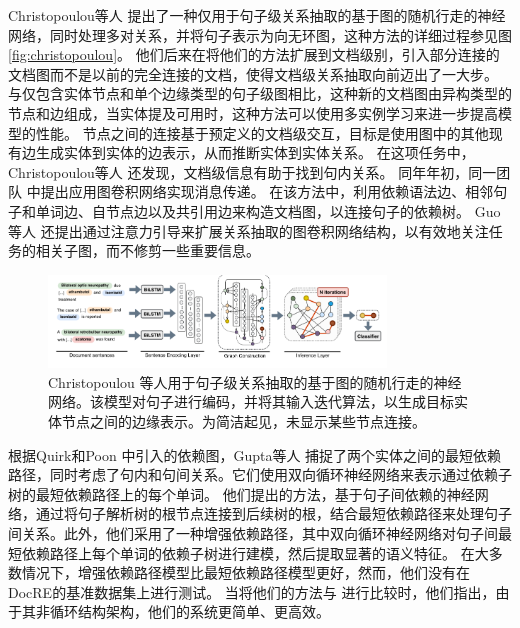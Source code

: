 \documentclass[bachelor]{thesis-uestc}
\begin{document}
Christopoulou等人 \cite{christopoulou-etal-2018-walk} 提出了一种仅用于句子级关系抽取的基于图的随机行走的神经网络，同时处理多对关系，并将句子表示为向无环图，这种方法的详细过程参见图\ref{fig:christopoulou}。
他们后来在将他们的方法扩展到文档级别，引入部分连接的文档图而不是以前的完全连接的文档，使得文档级关系抽取向前迈出了一大步。
与仅包含实体节点和单个边缘类型的句子级图相比，这种新的文档图由异构类型的节点和边组成，当实体提及可用时，这种方法可以使用多实例学习来进一步提高模型的性能。
节点之间的连接基于预定义的文档级交互，目标是使用图中的其他现有边生成实体到实体的边表示，从而推断实体到实体关系。
在这项任务中，Christopoulou等人 \cite{christopoulou-etal-2019-connecting}还发现，文档级信息有助于找到句内关系。
同年年初，同一团队 \cite{sahu-etal-2019-inter}中提出应用图卷积网络实现消息传递。
在该方法中，利用依赖语法边、相邻句子和单词边、自节点边以及共引用边来构造文档图，以连接句子的依赖树。
Guo等人 \cite{guo-etal-2019-attention}还提出通过注意力引导来扩展关系抽取的图卷积网络结构，以有效地关注任务的相关子图，而不修剪一些重要信息。\par
\begin{figure}
    \centering
    \includegraphics[width=0.8\textwidth]{misc/DAG2018.png}
    \caption{Christopoulou \cite{christopoulou-etal-2018-walk} 等人用于句子级关系抽取的基于图的随机行走的神经网络。该模型对句子进行编码，并将其输入迭代算法，以生成目标实体节点之间的边缘表示。为简洁起见，未显示某些节点连接。}
\end{figure}\label{fig:christopoulou}


根据Quirk和Poon \cite{quirk-poon-2017-distant} 中引入的依赖图，Gupta等人 \cite{Gupta_Rajaram_Schütze_Runkler_2019} 捕捉了两个实体之间的最短依赖路径，同时考虑了句内和句间关系。它们使用双向循环神经网络来表示通过依赖子树的最短依赖路径上的每个单词。
他们提出的方法，基于句子间依赖的神经网络，通过将句子解析树的根节点连接到后续树的根，结合最短依赖路径来处理句子间关系。此外，他们采用了一种增强依赖路径，其中双向循环神经网络对句子间最短依赖路径上每个单词的依赖子树进行建模，然后提取显著的语义特征。
在大多数情况下，增强依赖路径模型比最短依赖路径模型更好，然而，他们没有在DocRE的基准数据集上进行测试。
当将他们的方法与 \cite{peng-etal-2017-cross}进行比较时，他们指出，由于其非循环结构架构，他们的系统更简单、更高效。\par
\end{document}
